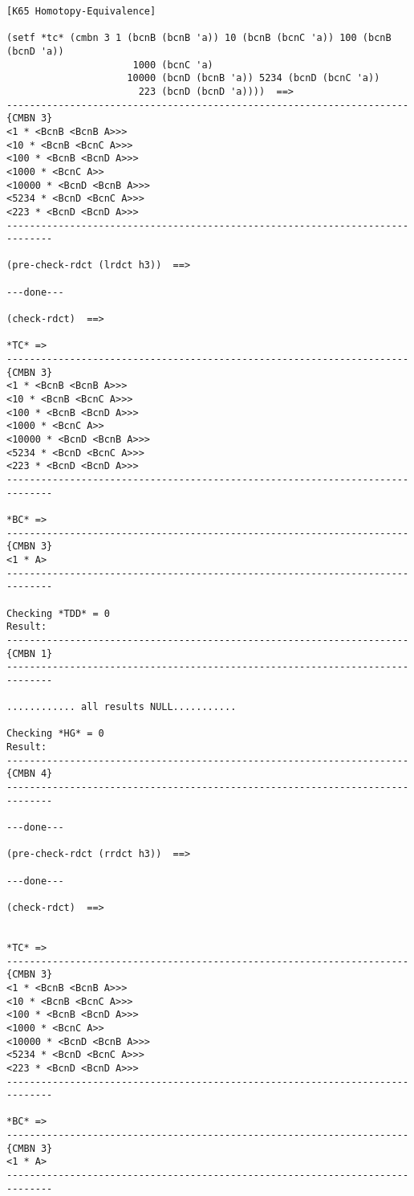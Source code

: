 {{\begin{verbatim}
[K65 Homotopy-Equivalence]

(setf *tc* (cmbn 3 1 (bcnB (bcnB 'a)) 10 (bcnB (bcnC 'a)) 100 (bcnB (bcnD 'a))
                      1000 (bcnC 'a)
                     10000 (bcnD (bcnB 'a)) 5234 (bcnD (bcnC 'a)) 
                       223 (bcnD (bcnD 'a))))  ==>
----------------------------------------------------------------------{CMBN 3}
<1 * <BcnB <BcnB A>>>
<10 * <BcnB <BcnC A>>>
<100 * <BcnB <BcnD A>>>
<1000 * <BcnC A>>
<10000 * <BcnD <BcnB A>>>
<5234 * <BcnD <BcnC A>>>
<223 * <BcnD <BcnD A>>>
------------------------------------------------------------------------------

(pre-check-rdct (lrdct h3))  ==>

---done---

(check-rdct)  ==>

*TC* => 
----------------------------------------------------------------------{CMBN 3}
<1 * <BcnB <BcnB A>>>
<10 * <BcnB <BcnC A>>>
<100 * <BcnB <BcnD A>>>
<1000 * <BcnC A>>
<10000 * <BcnD <BcnB A>>>
<5234 * <BcnD <BcnC A>>>
<223 * <BcnD <BcnD A>>>
------------------------------------------------------------------------------

*BC* => 
----------------------------------------------------------------------{CMBN 3}
<1 * A>
------------------------------------------------------------------------------

Checking *TDD* = 0
Result: 
----------------------------------------------------------------------{CMBN 1}
------------------------------------------------------------------------------

............ all results NULL...........

Checking *HG* = 0
Result: 
----------------------------------------------------------------------{CMBN 4}
------------------------------------------------------------------------------

---done---

(pre-check-rdct (rrdct h3))  ==>

---done---

(check-rdct)  ==>


*TC* => 
----------------------------------------------------------------------{CMBN 3}
<1 * <BcnB <BcnB A>>>
<10 * <BcnB <BcnC A>>>
<100 * <BcnB <BcnD A>>>
<1000 * <BcnC A>>
<10000 * <BcnD <BcnB A>>>
<5234 * <BcnD <BcnC A>>>
<223 * <BcnD <BcnD A>>>
------------------------------------------------------------------------------

*BC* => 
----------------------------------------------------------------------{CMBN 3}
<1 * A>
------------------------------------------------------------------------------


\end{verbatim}}}
